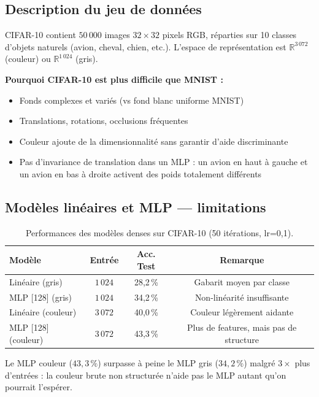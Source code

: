 \documentclass[a4paper,11pt]{article}
\begin{document}
\subsection{Description du jeu de données}

CIFAR-10 contient $50\,000$ images $32\times32$ pixels RGB, réparties sur 10 classes
d'objets naturels (avion, cheval, chien, etc.).
L'espace de représentation est $\mathbb{R}^{3\,072}$ (couleur) ou $\mathbb{R}^{1\,024}$ (gris).

\textbf{Pourquoi CIFAR-10 est plus difficile que MNIST :}
\begin{itemize}[leftmargin=*]
  \item Fonds complexes et variés (vs fond blanc uniforme MNIST)
  \item Translations, rotations, occlusions fréquentes
  \item Couleur ajoute de la dimensionnalité sans garantir d'aide discriminante
  \item Pas d'invariance de translation dans un MLP : un avion en haut à gauche
        et un avion en bas à droite activent des poids totalement différents
\end{itemize}

\subsection{Modèles linéaires et MLP — limitations}

\begin{table}[H]
\centering
\caption{Performances des modèles denses sur CIFAR-10 (50 itérations, lr=0{,}1).}
\begin{tabular}{lccc}
\toprule
\textbf{Modèle} & \textbf{Entrée} & \textbf{Acc. Test} & \textbf{Remarque} \\
\midrule
Linéaire (gris)    & $1\,024$ & 28{,}2\,\% & Gabarit moyen par classe \\
MLP [128] (gris)   & $1\,024$ & 34{,}2\,\% & Non-linéarité insuffisante \\
Linéaire (couleur) & $3\,072$ & 40{,}0\,\% & Couleur légèrement aidante \\
MLP [128] (couleur)& $3\,072$ & 43{,}3\,\% & Plus de features, mais pas de structure \\
\bottomrule
\end{tabular}
\label{tab:cifar_dense}
\end{table}

\noindent Le MLP couleur ($43{,}3\,\%$) surpasse à peine le MLP gris ($34{,}2\,\%$) malgré
$3\times$ plus d'entrées : la couleur brute non structurée n'aide pas le MLP autant qu'on
pourrait l'espérer.
\end{document}
